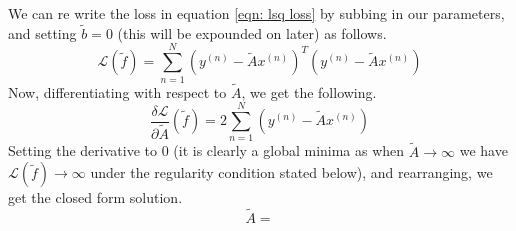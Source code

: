 \documentclass[letterpaper, 12pt]{article}
\newcommand{\1}{\mathds{1}}	%
\begin{document}
We can re write the loss in equation \ref{eqn: lsq loss} by subbing in our parameters, and setting \(\tilde{b}=0\) (this will be expounded on later) as follows.
\begin{equation}
    \mathscr{L}(\tilde{f}) = \sum_{n=1}^N (y^{(n)} - \tilde{A}x^{(n)})^T(y^{(n)} - \tilde{A}x^{(n)})
\end{equation}
Now, differentiating with respect to \(\tilde{A}\), we get the following.
\begin{equation}
    \frac{\delta \mathscr{L}}{\partial \tilde{A}}(\tilde{f}) = 2\sum_{n=1}^N (y^{(n)} - \tilde{A}x^{(n)})
\end{equation}
Setting the derivative to 0 (it is clearly a global minima as when \(\tilde{A} \to \infty\) we have \(\mathscr{L}(\tilde{f}) \to \infty\) under the regularity condition stated below), and rearranging, we get the closed form solution.
\begin{equation}
    \tilde{A} = 
\end{equation}
%
%
%
\end{document}
